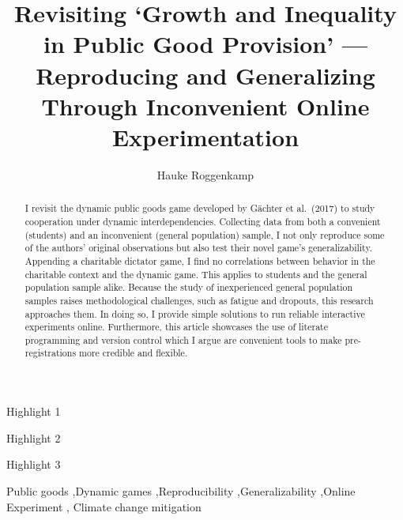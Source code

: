 \documentclass[
  authoryear,
  review,
  3p,
  onecolumn]{elsarticle}
\begin{document}
\begin{frontmatter}
\title{Revisiting `Growth and Inequality in Public Good Provision'
---Reproducing and Generalizing Through Inconvenient Online
Experimentation}
\author[1,2]{Hauke Roggenkamp%
%
}



        
\begin{abstract}
I revisit the dynamic public goods game developed by Gächter et
al.~(2017) to study cooperation under dynamic interdependencies.
Collecting data from both a convenient (students) and an inconvenient
(general population) sample, I not only reproduce some of the authors'
original observations but also test their novel game's generalizability.
Appending a charitable dictator game, I find no correlations between
behavior in the charitable context and the dynamic game. This applies to
students and the general population sample alike. Because the study of
inexperienced general population samples raises methodological
challenges, such as fatigue and dropouts, this research approaches them.
In doing so, I provide simple solutions to run reliable interactive
experiments online. Furthermore, this article showcases the use of
literate programming and version control which I argue are convenient
tools to make pre-registrations more credible and flexible.
\end{abstract}



\begin{highlights}
\item Highlight 1\item Highlight 2\item Highlight 3
\end{highlights}


\begin{keyword}
    Public goods \sep Dynamic
games \sep Reproducibility \sep Generalizability \sep Online
Experiment \sep 
    Climate change mitigation
\end{keyword}
\end{frontmatter}\ifdefined\Shaded\renewenvironment{Shaded}{\begin{tcolorbox}[frame hidden, borderline west={3pt}{0pt}{shadecolor}, breakable, enhanced, sharp corners, boxrule=0pt, interior hidden]}{\end{tcolorbox}}\fi
\end{document}
